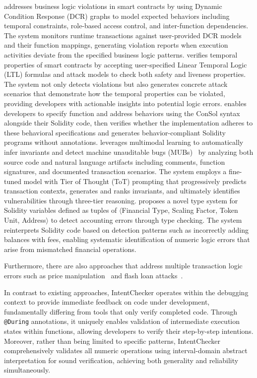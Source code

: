 \documentclass[pdflatex,sn-basic]{sn-jnl}%
\theoremstyle{thmstyleone}%
\theoremstyle{thmstyletwo}%
\theoremstyle{thmstylethree}%
\begin{document}
\citep{highguard} addresses business logic violations in smart contracts by using Dynamic Condition Response (DCR) graphs
to model expected behaviors including temporal constraints, role-based access control, and inter-function dependencies.
The system monitors runtime transactions against user-provided DCR models and their function mappings,
generating violation reports when execution activities deviate from the specified business logic patterns.
\citep{smartpulse} verifies temporal properties of smart contracts by accepting user-specified Linear Temporal Logic (LTL) formulas
and attack models to check both safety and liveness properties.
The system not only detects violations but also generates concrete attack scenarios that demonstrate how the temporal properties can be violated,
providing developers with actionable insights into potential logic errors.
\citep{consolidating} enables developers to specify function and address behaviors using the ConSol syntax alongside their Solidity code,
then verifies whether the implementation adheres to these behavioral specifications and generates behavior-compliant Solidity programs without annotations.
\citep{smartinv} leverages multimodal learning to automatically infer invariants and detect machine unauditable bugs (MUBs)~\citep{exploitablebugs}
by analyzing both source code and natural language artifacts including comments, function signatures, and documented transaction scenarios.
The system employs a fine-tuned model with Tier of Thought (ToT) prompting that progressively predicts transaction contexts,
generates and ranks invariants, and ultimately identifies vulnerabilities through three-tier reasoning.
\citep{accountingerrors} proposes a novel type system for Solidity variables defined as tuples of $\langle$Financial Type, Scaling Factor, Token Unit, Address$\rangle$
to detect accounting errors through type checking.
The system reinterprets Solidity code based on detection patterns such as incorrectly adding balances with fees,
enabling systematic identification of numeric logic errors that arise from mismatched financial operations.

Furthermore, there are also approaches that address multiple transaction logic errors such as price manipulation~\citep{defiranger,defiguard,pomabuster,secplf,defitainter}
and flash loan attacks~\citep{defitail,midnight}.

In contrast to existing approaches, IntentChecker operates within the debugging context to provide immediate feedback on code under development,
fundamentally differing from tools that only verify completed code.
Through \texttt{@During} annotations, it uniquely enables validation of intermediate execution states within functions,
allowing developers to verify their step-by-step intentions.
Moreover, rather than being limited to specific patterns, IntentChecker comprehensively validates all numeric operations
using interval-domain abstract interpretation for sound verification, achieving both generality and reliability simultaneously.
\end{document}
